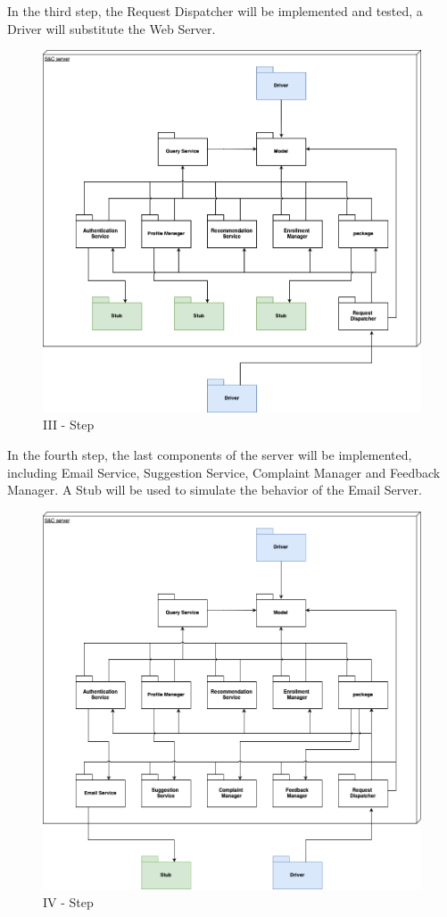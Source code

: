 In the third step, the Request Dispatcher will be implemented and tested, a Driver
will substitute the Web Server.

\begin{figure}[H]
    \centering
    \includegraphics[width=450px]{../../assets/pakege-diagram/implementation_plan_3.png}
    \caption{III - Step}
\end{figure}


\newpage

In the fourth step, the last components of the server will be implemented, including Email Service, Suggestion Service,
Complaint Manager and Feedback Manager. 
A Stub will be used to simulate the behavior of the Email Server.

\begin{figure}[H]
    \centering
    \includegraphics[width=450px]{../../assets/pakege-diagram/implementation_plan_4.png}
    \caption{IV - Step}
\end{figure}


